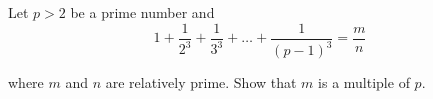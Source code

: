 Let $p>2$ be a prime number and\[1+\frac{1}{2^3}+\frac{1}{3^3}+\ldots +\frac{1}{(p-1)^3}=\frac{m}{n}\]

where $m$ and $n$ are relatively prime. Show that $m$ is a multiple of $p$.